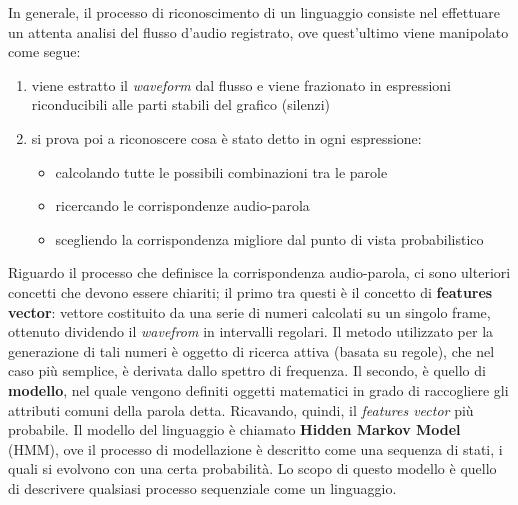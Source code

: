 \documentclass[12pt]{article}
\begin{document}
    In generale, il processo di riconoscimento di un linguaggio consiste nel effettuare un attenta analisi del flusso d'audio registrato, ove quest'ultimo viene manipolato come segue:
    \begin{enumerate}
    \item viene estratto il \textit{waveform} dal flusso e viene frazionato in espressioni riconducibili alle parti stabili del grafico (silenzi)
    \item si prova poi a riconoscere cosa è stato detto in ogni espressione:
    \begin{itemize}
         
        \item calcolando tutte le possibili combinazioni tra le parole
        \item ricercando le corrispondenze audio-parola
        \item scegliendo la corrispondenza migliore dal punto di vista probabilistico 
    \end{itemize}
    \end{enumerate}
    
    Riguardo il processo che definisce la corrispondenza audio-parola, ci sono ulteriori concetti che devono essere chiariti; il primo tra questi è il concetto di \textbf{features vector}: vettore costituito da una serie di numeri calcolati su un singolo frame, ottenuto dividendo il \textit{wavefrom} in intervalli regolari.
    Il metodo utilizzato per la generazione di tali numeri è oggetto di ricerca attiva (basata su regole), che nel caso più semplice, è derivata dallo spettro di frequenza. Il secondo, è quello di \textbf{modello}, nel quale vengono definiti oggetti matematici in grado di raccogliere gli attributi comuni della parola detta. Ricavando, quindi, il \textit{features vector} più probabile. Il modello del linguaggio è chiamato \textbf{Hidden Markov Model} (HMM), ove il processo di modellazione è descritto come una sequenza di stati, i quali si evolvono con una certa probabilità. Lo scopo di questo modello è quello di descrivere qualsiasi processo sequenziale come un linguaggio.    
    
\end{document}
